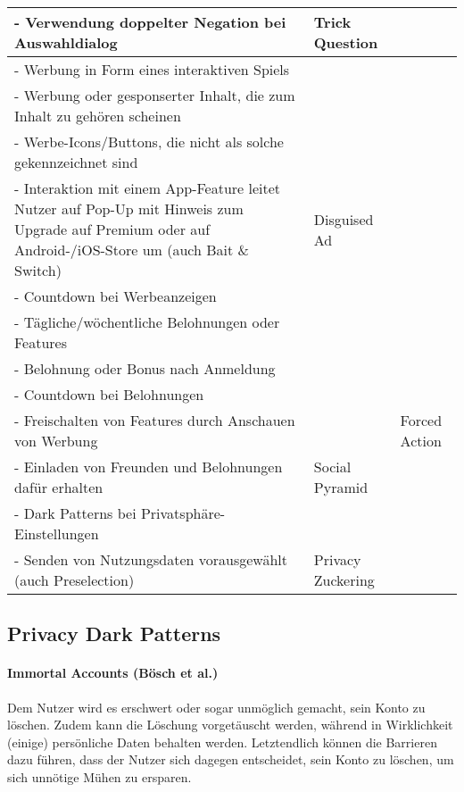\documentclass[a4paper]{article}
\begin{document}
\begin{table}
\begin{tabular}{|l|l|l|}
        - Verwendung doppelter Negation bei Auswahldialog & Trick Question &  \\ \hline
        - Werbung in Form eines interaktiven Spiels &  &  \\ \hline
        - Werbung oder gesponserter Inhalt, die zum Inhalt zu gehören scheinen &  &  \\ \hline
        - Werbe-Icons/Buttons, die nicht als solche gekennzeichnet sind &  &  \\ \hline
        - Interaktion mit einem App-Feature leitet Nutzer auf Pop-Up 
        mit Hinweis zum Upgrade auf Premium oder auf 
        Android-/iOS-Store um (auch Bait \& Switch) & Disguised Ad &  \\ \hline
        - Countdown bei Werbeanzeigen &  &  \\ \hline
        - Tägliche/wöchentliche Belohnungen oder Features &  &  \\ \hline
        - Belohnung oder Bonus nach Anmeldung &  &  \\ \hline
        - Countdown bei Belohnungen &  &  \\ \hline
        - Freischalten von Features durch Anschauen von Werbung &  & Forced Action \\ \hline
        - Einladen von Freunden und Belohnungen dafür erhalten & Social Pyramid &  \\ \hline
        - Dark Patterns bei Privatsphäre-Einstellungen &  &  \\ \hline
        - Senden von Nutzungsdaten vorausgewählt (auch Preselection) & Privacy Zuckering &  \\ \hline
    \end{tabular}
\end{table}

\subsection{Privacy Dark Patterns}
\label{sub:privacy_dark_patterns}

\paragraph{Immortal Accounts (Bösch et al.)}
Dem Nutzer wird es erschwert oder sogar unmöglich gemacht, sein Konto zu löschen. Zudem kann die Löschung vorgetäuscht werden, während in Wirklichkeit (einige) persönliche Daten behalten werden. Letztendlich können die Barrieren dazu führen, dass der Nutzer sich dagegen entscheidet, sein Konto zu löschen, um sich unnötige Mühen zu ersparen. 
\end{document}
